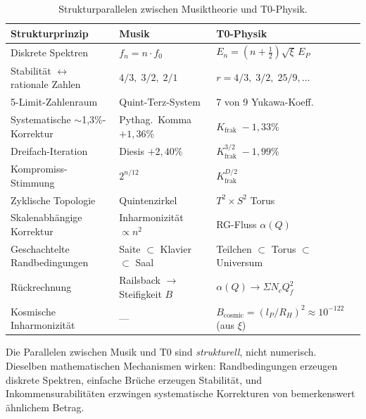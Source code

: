 \begin{table}[h]
\centering
\begin{tabular}{lll}
	\toprule
	Strukturprinzip & Musik & T0-Physik\\
	\midrule
	Diskrete Spektren & $f_n = n \cdot f_0$ & $E_n = (n+\tfrac{1}{2})\sqrt{\xi}\,E_P$\\
	Stabilität $\leftrightarrow$ rationale Zahlen & $4/3,\; 3/2,\; 2/1$ & $r = 4/3,\; 3/2,\; 25/9, \ldots$\\
	5-Limit-Zahlenraum & Quint-Terz-System & 7 von 9 Yukawa-Koeff.\\
	Systematische $\sim$1{,}3\%-Korrektur & Pythag.\ Komma $+1{,}36\%$ & $K_\text{frak}\; -1{,}33\%$\\
	Dreifach-Iteration & Diesis $+2{,}40\%$ & $K_\text{frak}^{3/2}\; -1{,}99\%$\\
	Kompromiss-Stimmung & $2^{n/12}$ & $K_\text{frak}^{D/2}$\\
	Zyklische Topologie & Quintenzirkel & $T^2 \times S^2$ Torus\\
	Skalenabhängige Korrektur & Inharmonizität $\propto n^2$ & RG-Fluss $\alpha(Q)$\\
	Geschachtelte Randbedingungen & Saite $\subset$ Klavier $\subset$ Saal & Teilchen $\subset$ Torus $\subset$ Universum\\
	Rückrechnung & Railsback $\to$ Steifigkeit $B$ & $\alpha(Q) \to \Sigma N_c Q_f^2$\\
	Kosmische Inharmonizität & --- & $B_\text{cosmic} = (l_P/R_H)^2 \approx 10^{-122}$ (aus $\xi$)\\
	\bottomrule
\end{tabular}
\caption{Strukturparallelen zwischen Musiktheorie und T0-Physik.}
\label{tab:zusammenfassung}
\end{table}

Die Parallelen zwischen Musik und T0 sind \emph{strukturell}, nicht numerisch. Dieselben mathematischen Mechanismen wirken: Randbedingungen erzeugen diskrete Spektren, einfache Brüche erzeugen Stabilität, und Inkommensurabilitäten erzwingen systematische Korrekturen von bemerkenswert ähnlichem Betrag.
